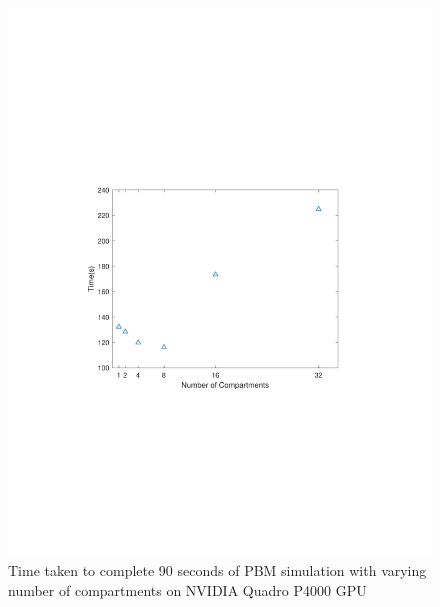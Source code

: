 \documentclass[preprint,10pt,authoryear,review]{elsarticle}
\begin{document}
\begin{figure}[h]
\centering
\includegraphics[scale=0.7,trim=110 220 120 220, clip]{desktopgputiming.pdf}
\caption{Time taken to complete 90 seconds of PBM simulation with varying number of compartments 
on NVIDIA Quadro P4000 GPU}
\label{fig:res_gpu_timings}
\end{figure}
\end{document}
